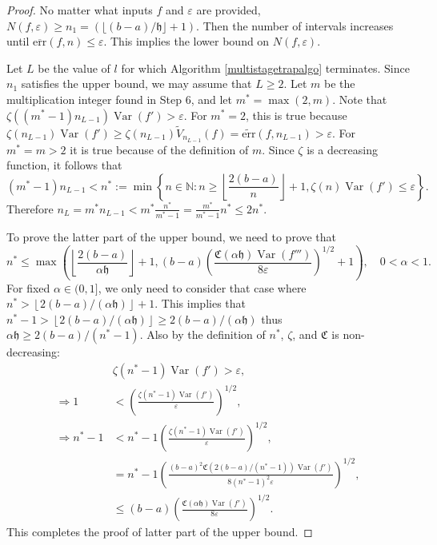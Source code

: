 \documentclass{iitthesis}
\DeclareMathOperator{\Var}{Var}
\theoremstyle{definition}
\theoremstyle{remark}
\begin{document}
\begin{proof}
  No matter what inputs $f$ and $\varepsilon$ are provided, $N(f,\varepsilon)\ge n_1=(\lfloor (b-a)/\mathfrak{h}\rfloor+1)$. Then the number of intervals increases until $\overline{\text{err}}(f,n)\le\varepsilon$. This implies the lower bound on $N(f,\varepsilon)$.

  Let $L$ be the value of $l$ for which Algorithm \ref{multistagetrapalgo} terminates. Since $n_1$ satisfies the upper bound, we may assume that $L \ge 2$. Let $m$ be the multiplication integer found in Step 6, and let $m^*=\max(2,m)$. Note that $\zeta((m^*-1)n_{L-1})\Var(f')>\varepsilon$. For $m^*=2$, this is true because $\zeta(n_{L-1})\Var(f')\ge\zeta(n_{L-1})\widetilde{V}_{n_{L-1}}(f)=\widetilde{\text{err}}(f,n_{L-1})>\varepsilon$. For $m^*=m>2$ it is true because of the definition of $m$. Since $\zeta$ is a decreasing function, it follows that
  $$(m^*-1)n_{L-1}<n^*:=\min\left\{n\in\mathbb{N}:n\ge\left\lfloor\frac{2(b-a)}{n}\right\rfloor+1,\zeta(n)\Var(f')\le\varepsilon\right\}.$$
  Therefore $n_L=m^*n_{L-1}<m^*\frac{n^*}{m^*-1}=\frac{m^*}{m^*-1}n^*\le2n^*$.

  To prove the latter part of the upper bound, we need to prove that
  $$n^*\leq\max\left(\left\lfloor\frac{2(b-a)}{\alpha\mathfrak{h}}\right\rfloor+1,(b-a)\left(\frac{\mathfrak{C}(\alpha\mathfrak{h})\Var(f''')}{8\varepsilon}\right)^{1/2}+1\right),\quad 0<\alpha<1.$$
  For fixed $\alpha\in(0,1]$, we only need to consider that case where $n^*>\left\lfloor2(b-a)/(\alpha\mathfrak{h})\right\rfloor+1$. This implies that $n^*-1>\left\lfloor2(b-a)/(\alpha\mathfrak{h})\right\rfloor\ge 2(b-a)/(\alpha\mathfrak{h})$ thus $\alpha\mathfrak{h}\ge2(b-a)/(n^*-1)$. Also by the definition of $n^*$, $\zeta$, and $\mathfrak{C}$ is non-decreasing:
  \begin{align*}
    &\zeta(n^*-1)\Var(f')>\varepsilon, \\
    \Rightarrow 1&<\left(\frac{\zeta(n^*-1)\Var(f')}{\varepsilon}\right)^{1/2},\\
    \Rightarrow n^*-1&<n^*-1\left(\frac{\zeta(n^*-1)\Var(f')}{\varepsilon}\right)^{1/2},\\
    &=n^*-1\left(\frac{(b-a)^2\mathfrak{C}(2(b-a)/(n^*-1))\Var(f')}{8(n^*-1)^2\varepsilon}\right)^{1/2},\\
    &\le(b-a)\left(\frac{\mathfrak{C}(\alpha\mathfrak{h})\Var(f')}{8\varepsilon}\right)^{1/2}.
  \end{align*}
  This completes the proof of latter part of the upper bound.
\end{proof}
\end{document}
